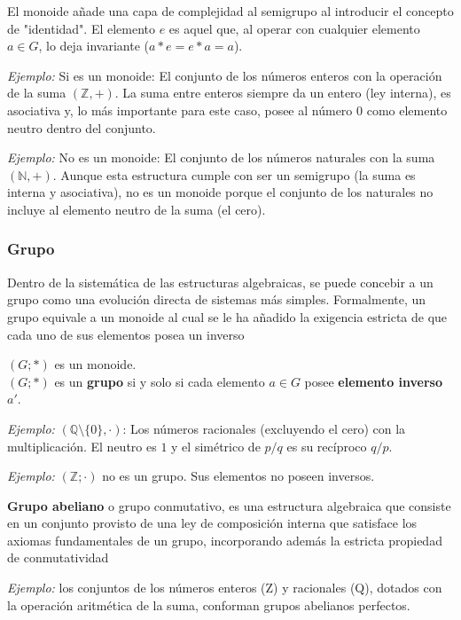 \documentclass{article}
\begin{document}
\noindent El monoide añade una capa de complejidad al semigrupo al introducir el concepto de "identidad". El elemento $e$ es aquel que, al operar con cualquier elemento $a \in G$, lo deja invariante ($a \ast e = e \ast a = a$).
\bigskip

\noindent \textit{Ejemplo:} Si es un monoide: El conjunto de los números enteros con la operación de la suma $(\mathbb{Z},+)$. La suma entre enteros siempre da un entero (ley interna), es asociativa y, lo más importante para este caso, posee al número $0$ como elemento neutro dentro del conjunto.
\bigskip

\noindent \textit{Ejemplo:} No es un monoide: El conjunto de los números naturales con la suma $(\mathbb{N},+)$. Aunque esta estructura cumple con ser un semigrupo (la suma es interna y asociativa), no es un monoide porque el conjunto de los naturales no incluye al elemento neutro de la suma (el cero).


\subsubsection{Grupo}
\label{sec:grupo}
Dentro de la sistemática de las estructuras algebraicas, se puede concebir a un grupo como una evolución directa de sistemas más simples. Formalmente, un grupo equivale a un monoide al cual se le ha añadido la exigencia estricta de que cada uno de sus elementos posea un inverso

\begin{center}
$(G; \ast)$ es un monoide.\\
$(G; \ast)$ es un \textbf{grupo} si y solo si cada elemento $a \in G$ posee \textbf{elemento inverso} $a'$.
\end{center}
\bigskip

\textit{Ejemplo:}
$(\mathbb{Q} \setminus \{0\}, \cdot)$: Los números racionales (excluyendo el cero) con la multiplicación. El neutro es $1$ y el simétrico de $p/q$ es su recíproco $q/p$.
\bigskip

\textit{Ejemplo:}
\noindent $(\mathbb{Z} ; \cdot)$ no es un grupo. Sus elementos no poseen inversos.
\bigskip

\textbf{Grupo abeliano} o grupo conmutativo, es una estructura algebraica que consiste en un conjunto provisto de una ley de composición interna que satisface los axiomas fundamentales de un grupo, incorporando además la estricta propiedad de conmutatividad

\textit{Ejemplo:} los conjuntos de los números enteros (Z) y racionales (Q), dotados con la operación aritmética de la suma, conforman grupos abelianos perfectos.
\bigskip
\end{document}
